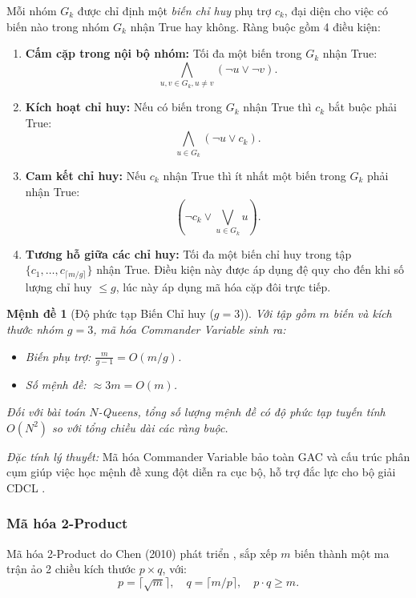 \documentclass[a4paper,fleqn]{cas-sc}
\newtheorem{proposition}{Mệnh đề}
\begin{document}
Mỗi nhóm $G_k$ được chỉ định một \textit{biến chỉ huy} phụ trợ $c_k$, đại diện cho việc có biến nào trong nhóm $G_k$ nhận True hay không. Ràng buộc gồm 4 điều kiện:
\begin{enumerate}
    \item \textbf{Cấm cặp trong nội bộ nhóm:} Tối đa một biến trong $G_k$ nhận True:
    \begin{equation}
        \bigwedge_{u, v \in G_k, u \neq v} (\neg u \lor \neg v).
    \end{equation}
    \item \textbf{Kích hoạt chỉ huy:} Nếu có biến trong $G_k$ nhận True thì $c_k$ bắt buộc phải True:
    \begin{equation}
        \bigwedge_{u \in G_k} (\neg u \lor c_k).
    \end{equation}
    \item \textbf{Cam kết chỉ huy:} Nếu $c_k$ nhận True thì ít nhất một biến trong $G_k$ phải nhận True:
    \begin{equation}
        (\neg c_k \lor \bigvee_{u \in G_k} u).
    \end{equation}
    \item \textbf{Tương hỗ giữa các chỉ huy:} Tối đa một biến chỉ huy trong tập $\{c_1, \dots, c_{\lceil m/g \rceil}\}$ nhận True. Điều kiện này được áp dụng đệ quy cho đến khi số lượng chỉ huy $\le g$, lúc này áp dụng mã hóa cặp đôi trực tiếp.
\end{enumerate}

\begin{proposition}[Độ phức tạp Biến Chỉ huy ($g=3$)]
Với tập gồm $m$ biến và kích thước nhóm $g=3$, mã hóa Commander Variable sinh ra:
\begin{itemize}
    \item Biến phụ trợ: $\frac{m}{g - 1} = O(m/g)$.
    \item Số mệnh đề: $\approx 3m = O(m)$.
\end{itemize}
Đối với bài toán $N$-Queens, tổng số lượng mệnh đề có độ phức tạp tuyến tính $O(N^2)$ so với tổng chiều dài các ràng buộc.
\end{proposition}

\textit{Đặc tính lý thuyết:} Mã hóa Commander Variable bảo toàn GAC và cấu trúc phân cụm giúp việc học mệnh đề xung đột diễn ra cục bộ, hỗ trợ đắc lực cho bộ giải CDCL \cite{klieber2007commander}.

\subsubsection{Mã hóa 2-Product}
Mã hóa 2-Product do Chen (2010) phát triển \cite{chen2010new}, sắp xếp $m$ biến thành một ma trận ảo 2 chiều kích thước $p \times q$, với:
\begin{equation}
    p = \lceil \sqrt{m} \rceil, \quad q = \lceil m / p \rceil, \quad p \cdot q \ge m.
\end{equation}
\end{document}
